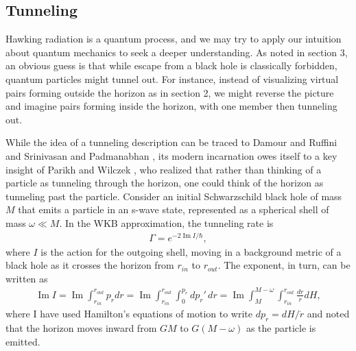 \documentclass[11pt]{article}
\begin{document}
\subsection{Tunneling \label{Tunna}}

Hawking radiation is a quantum process, and we may try to apply our
intuition about quantum mechanics to seek a deeper understanding. 
As noted in section 3, an obvious guess is that while escape 
from a black hole is classically forbidden, quantum particles might
tunnel out.  For instance, instead of visualizing virtual pairs forming
outside the horizon as in section 2, we might reverse the 
picture and imagine pairs forming inside the horizon, with 
one member then tunneling out.

While the idea of a tunneling description can be traced to Damour and
Ruffini \cite{Damour} and Srinivasan and Padmanabhan \cite{SriPad}, 
its modern incarnation owes itself to a key insight
of Parikh and Wilczek \cite{Parikh}, who realized that rather than 
thinking of a particle as tunneling through the horizon, one could think 
of the horizon as tunneling past the particle.  
Consider an initial Schwarzschild black hole of mass $M$ that emits
a particle in an s-wave state, represented as a spherical shell of mass
$\omega \ll M$.  In the WKB approximation, the tunneling rate is
\begin{align}
\Gamma = e^{-2\mathop{Im} I/\hbar}  ,
\label{Carlipe3}
\end{align}
where $I$ is the action for the outgoing shell, moving in a background
metric of a black hole as it crosses the horizon from
$r_{\scriptscriptstyle\mathit{in}}$ to $r_{\scriptscriptstyle\mathit{out}}$.
The exponent, in turn, can be written as
\begin{align}
\mathop{Im} I = 
\mathop{Im}
\int_{r_{\scriptscriptstyle\mathit{in}}}^{r_{\scriptscriptstyle\mathit{out}}}
p_r dr = 
\mathop{Im}
\int_{r_{\scriptscriptstyle\mathit{in}}}^{r_{\scriptscriptstyle\mathit{out}}}
\int_0^{p_r}dp_r'\,dr =
\mathop{Im}\int_M^{M-\omega} 
\int_{r_{\scriptscriptstyle\mathit{in}}}^{r_{\scriptscriptstyle\mathit{out}}}
\frac{dr}{{\dot r}}dH ,
\label{Carlipe4}
\end{align}
where I have used Hamilton's equations of motion to write 
$dp_r = dH/{\dot r}$ and noted that the horizon moves inward from 
$GM$ to $G(M-\omega)$ as the particle is emitted.
\end{document}
